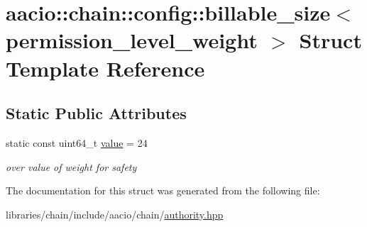\hypertarget{structaacio_1_1chain_1_1config_1_1billable__size_3_01permission__level__weight_01_4}{}\section{aacio\+:\+:chain\+:\+:config\+:\+:billable\+\_\+size$<$ permission\+\_\+level\+\_\+weight $>$ Struct Template Reference}
\label{structaacio_1_1chain_1_1config_1_1billable__size_3_01permission__level__weight_01_4}
\subsection*{Static Public Attributes}
\begin{DoxyCompactItemize}
\item 
\mbox{\label{structaacio_1_1chain_1_1config_1_1billable__size_3_01permission__level__weight_01_4_ae951ae53ffb6fadd3560793e25a3b193}} 
static const uint64\+\_\+t \mbox{\hyperlink{structaacio_1_1chain_1_1config_1_1billable__size_3_01permission__level__weight_01_4_ae951ae53ffb6fadd3560793e25a3b193}{value}} = 24
\begin{DoxyCompactList}\small\item\em over value of weight for safety \end{DoxyCompactList}\end{DoxyCompactItemize}


The documentation for this struct was generated from the following file\+:\begin{DoxyCompactItemize}
\item 
libraries/chain/include/aacio/chain/\mbox{\hyperlink{authority_8hpp}{authority.\+hpp}}\end{DoxyCompactItemize}
